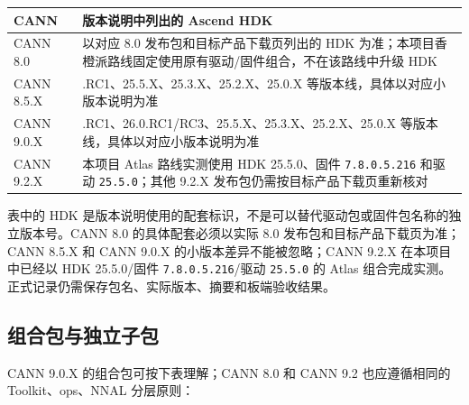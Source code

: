 \begin{longtable}[]{@{}
  >{\raggedright\arraybackslash}p{}
  >{\raggedright\arraybackslash}p{}@{}}
\toprule\noalign{}
\begin{minipage}[b]{\linewidth}\raggedright
CANN
\end{minipage} & \begin{minipage}[b]{\linewidth}\raggedright
版本说明中列出的 Ascend HDK
\end{minipage} \\
\midrule\noalign{}
\endhead
\bottomrule\noalign{}
\endlastfoot
CANN 8.0 & 以对应 8.0 发布包和目标产品下载页列出的 HDK
为准；本项目香橙派路线固定使用原有驱动/固件组合，不在该路线中升级 HDK \\
CANN 8.5.X & 26.0.RC1、25.5.X、25.3.X、25.2.X、25.0.X
等版本线，具体以对应小版本说明为准 \\
CANN 9.0.X & 25.7.RC1、26.0.RC1/RC3、25.5.X、25.3.X、25.2.X、25.0.X
等版本线，具体以对应小版本说明为准 \\
CANN 9.2.X & 本项目 Atlas 路线实测使用 HDK 25.5.0、固件
\passthrough{\lstinline!7.8.0.5.216!} 和驱动
\passthrough{\lstinline!25.5.0!}；其他 9.2.X
发布包仍需按目标产品下载页重新核对 \\
\end{longtable}

表中的 HDK
是版本说明使用的配套标识，不是可以替代驱动包或固件包名称的独立版本号。CANN
8.0 的具体配套必须以实际 8.0 发布包和目标产品下载页为准；CANN 8.5.X 和
CANN 9.0.X 的小版本差异不能被忽略；CANN 9.2.X 在本项目中已经以 HDK
25.5.0/固件 \passthrough{\lstinline!7.8.0.5.216!}/驱动
\passthrough{\lstinline!25.5.0!} 的 Atlas
组合完成实测。正式记录仍需保存包名、实际版本、摘要和板端验收结果。

\subsection{组合包与独立子包}\label{ux7ec4ux5408ux5305ux4e0eux72ecux7acbux5b50ux5305}

CANN 9.0.X 的组合包可按下表理解；CANN 8.0 和 CANN 9.2 也应遵循相同的
Toolkit、ops、NNAL 分层原则：

